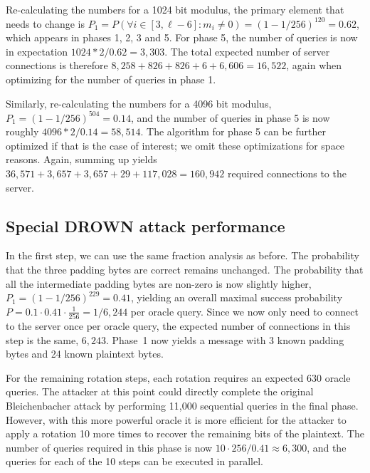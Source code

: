Re-calculating the numbers for a 1024 bit modulus, the primary element that needs to change is $P_1 = P(\forall i \in [3, \ell-6]: m_i \neq 0) = (1 - 1/256)^{120} = 0.62$, which appears in phases 1, 2, 3 and 5. For phase 5, the number of queries is now in expectation $1024 * 2 / 0.62 = 3,303$. The total expected number of server connections is therefore $8,258 + 826 + 826 + 6 + 6,606 = 16,522$, again when optimizing for the number of queries in phase 1.

Similarly, re-calculating the numbers for a 4096 bit modulus, $P_1 = (1 - 1/256)^{504} = 0.14$, and the number of queries in phase 5 is now roughly $4096 * 2 / 0.14 = 58,514$. The algorithm for phase 5 can be further optimized if that is the case of interest; we omit these optimizations for space reasons. Again, summing up yields $36,571 + 3,657 + 3,657 + 29 + 117,028 = 160,942$ required connections to the server.

\balance

\subsection{Special DROWN attack performance}
\label{sec:special-performance}

In the first step, we can use the same fraction analysis as before. The probability that the three padding bytes are correct remains unchanged. The probability that all the intermediate padding bytes are non-zero is now slightly higher, $P_1 = (1 - 1/256)^{229} = 0.41$, yielding an overall maximal success probability $P = 0.1 \cdot 0.41 \cdot \frac{1}{256} = 1/6,244$ per oracle query. Since we now only need to connect to the server once per oracle query, the expected number of connections in this step is the same, $6,243$. Phase~1 now yields a message with 3 known padding bytes and 24 known plaintext bytes.

For the remaining rotation steps, each rotation requires an expected 630 oracle queries.  The attacker at this point could directly complete the original Bleichenbacher attack by performing 11,000 sequential queries in the final phase.  However, with this more powerful oracle it is more efficient for the attacker to apply a rotation 10 more times to recover the remaining bits of the plaintext. The number of queries required in this phase is now $10\cdot 256/0.41\approx 6,300$, and the queries for each of the 10 steps can be executed in parallel.

